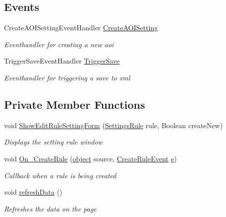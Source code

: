 \subsection*{Events}
\begin{DoxyCompactItemize}
\item 
Create\+A\+O\+I\+Setting\+Event\+Handler \hyperlink{class_web_analyzer_1_1_u_i_1_1_interaction_objects_1_1_a_o_i_setting_control_a655f9d463578bed0ae1ce3243eee82c0}{Create\+A\+O\+I\+Setting}
\begin{DoxyCompactList}\small\item\em Eventhandler for creating a new aoi \end{DoxyCompactList}\item 
Trigger\+Save\+Event\+Handler \hyperlink{class_web_analyzer_1_1_u_i_1_1_interaction_objects_1_1_a_o_i_setting_control_a752fb801d539bc3df62f41bb854074e2}{Trigger\+Save}
\begin{DoxyCompactList}\small\item\em Eventhandler for triggering a save to xml \end{DoxyCompactList}\end{DoxyCompactItemize}
\subsection*{Private Member Functions}
\begin{DoxyCompactItemize}
\item 
void \hyperlink{class_web_analyzer_1_1_u_i_1_1_interaction_objects_1_1_a_o_i_setting_control_ae24e397e2156f90970cd5d74b8fde800}{Show\+Edit\+Rule\+Setting\+Form} (\hyperlink{class_web_analyzer_1_1_models_1_1_settings_model_1_1_settings_rule}{Settings\+Rule} rule, Boolean create\+New)
\begin{DoxyCompactList}\small\item\em Displays the setting rule window \end{DoxyCompactList}\item 
void \hyperlink{class_web_analyzer_1_1_u_i_1_1_interaction_objects_1_1_a_o_i_setting_control_ac465620c69a2312ef3a901e95890c2ca}{On\+\_\+\+Create\+Rule} (\hyperlink{_u_i_2_h_t_m_l_resources_2js_2lib_2underscore_8min_8js_aae18b7515bb2bc4137586506e7c0c903}{object} source, \hyperlink{class_web_analyzer_1_1_events_1_1_create_rule_event}{Create\+Rule\+Event} \hyperlink{_u_i_2_h_t_m_l_resources_2js_2lib_2bootstrap_8min_8js_ab5902775854a8b8440bcd25e0fe1c120}{e})
\begin{DoxyCompactList}\small\item\em Callback when a rule is being created \end{DoxyCompactList}\item 
void \hyperlink{class_web_analyzer_1_1_u_i_1_1_interaction_objects_1_1_a_o_i_setting_control_a6a6d45603c57847782b592f6234ab743}{refresh\+Data} ()
\begin{DoxyCompactList}\small\item\em Refreshes the data on the page \end{DoxyCompactList}\end{DoxyCompactItemize}

